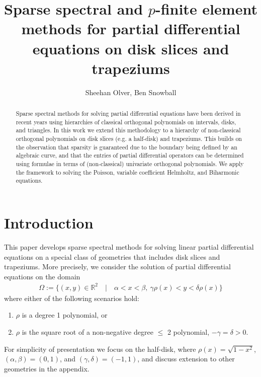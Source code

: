\documentclass[11pt, oneside]{article}   	%
\title{Sparse spectral and $p$-finite element methods for partial differential equations on disk slices and trapeziums}
\author{Sheehan Olver, Ben Snowball}
\newcommand{\R}{\mathbb{R}}
\begin{document}
\maketitle

\begin{abstract}
Sparse spectral methods for solving partial differential equations have been derived in recent years using hierarchies of classical orthogonal polynomials on intervals, disks, and triangles. In this work we extend this methodology to a hierarchy of non-classical orthogonal polynomials on disk slices (e.g. a half-disk) and trapeziums. This builds on the observation that sparsity is guaranteed due to the boundary being defined by an algebraic curve, and that the entries of partial differential operators can be determined using formulae in terms of (non-classical) univariate orthogonal polynomials.  We apply the framework to solving the Poisson, variable coefficient Helmholtz, and Biharmonic equations.
 \end{abstract}


%
\section{Introduction}

This paper develops sparse spectral methods for solving linear partial differential equations on a special class of geometries that includes disk slices and trapeziums.  
More precisely, we consider the solution of partial differential equations on the domain
\begin{align*}
	\Omega := \{(x,y) \in \R^2 \quad | \quad \alpha < x < \beta, \: \gamma \rho(x) < y < \delta \rho(x)\}
\end{align*}
where  either of the following scenarios hold:
\begin{enumerate}
\item  \(\rho\) is a degree 1 polynomial, or 
\item \(\rho\) is the square root of a non-negative degree \(\le\) 2 polynomial, \(-\gamma = \delta > 0\).
\end{enumerate}

For simplicity of presentation we focus on the half-disk, where $\rho(x) = \sqrt{1-x^2}$,  $(\alpha,\beta) = (0, 1)$, and  $(\gamma, \delta)  = (-1,1)$, and discuss extension to other geometries in the appendix. 
\end{document}
